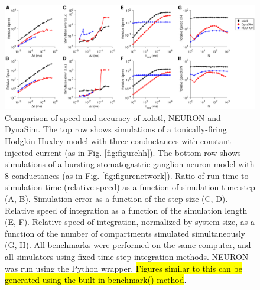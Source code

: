 \documentclass{frontiersSCNS} %
\begin{document}
\begin{figure}
	\centering
	\includegraphics[width=1.0\linewidth]{gfx/figure_benchmark}
	\caption{Comparison of speed and accuracy of xolotl, NEURON and DynaSim. The top row shows simulations of a tonically-firing Hodgkin-Huxley model with three conductances with constant injected current (as in Fig. \ref{fig:figurehh}). The bottom row shows simulations of  a bursting stomatogastric ganglion neuron model with 8 conductances (as in Fig. \ref{fig:figurenetwork}). Ratio of run-time to simulation time (relative speed) as a function of simulation time step (A, B). Simulation error as a function of the step size (C, D).  Relative speed of integration as a function of the simulation length (E, F). Relative speed of integration, normalized by system size, as a function of the number of compartments simulated simultaneously (G, H). All benchmarks were performed on the same computer, and all simulators using fixed time-step integration methods. NEURON was run using the Python wrapper. \hl{Figures similar to this can be generated using the built-in benchmark() method}.}
	\label{fig:figurebenchmark}
\end{figure}
\end{document}
